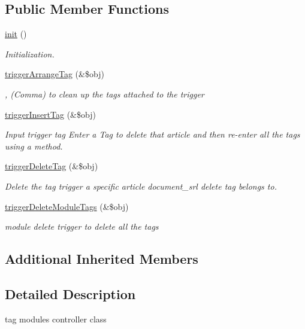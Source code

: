 \subsection*{Public Member Functions}
\begin{DoxyCompactItemize}
\item 
\hyperlink{classtagController_ada37b0f9e302b94d20dcc5f7168afb3b}{init} ()
\begin{DoxyCompactList}\small\item\em Initialization. \end{DoxyCompactList}\item 
\hyperlink{classtagController_a22edcccfa0ab6967230adf5a3d1bab27}{trigger\+Arrange\+Tag} (\&\$obj)
\begin{DoxyCompactList}\small\item\em , (Comma) to clean up the tags attached to the trigger \end{DoxyCompactList}\item 
\hyperlink{classtagController_ae17dc9d2d9f4d1193c4bb76e2296a060}{trigger\+Insert\+Tag} (\&\$obj)
\begin{DoxyCompactList}\small\item\em Input trigger tag Enter a Tag to delete that article and then re-\/enter all the tags using a method. \end{DoxyCompactList}\item 
\hyperlink{classtagController_a10bdcf92aea9f67d9c827d910e4454c9}{trigger\+Delete\+Tag} (\&\$obj)
\begin{DoxyCompactList}\small\item\em Delete the tag trigger a specific article document\+\_\+srl delete tag belongs to. \end{DoxyCompactList}\item 
\hyperlink{classtagController_a923a01c674ed2ad08b6e25e88f1001cf}{trigger\+Delete\+Module\+Tags} (\&\$obj)
\begin{DoxyCompactList}\small\item\em module delete trigger to delete all the tags \end{DoxyCompactList}\end{DoxyCompactItemize}
\subsection*{Additional Inherited Members}


\subsection{Detailed Description}
tag module\textquotesingle{}s controller class 

